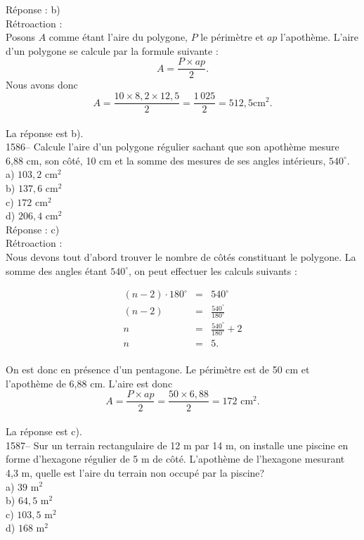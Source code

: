 R\'eponse : b)\\

R\'etroaction :\\
Posons $A$ comme \'etant l'aire du polygone, $P$ le p\'erim\`etre et
$ap$ l'apoth\`eme. L'aire d'un polygone se calcule par la formule
suivante :$$A=\frac{P\times ap}{2}.$$Nous avons
donc$$A=\frac{10\times8,2\times12,5}{2}=\frac{1\,025}{2}=512,5{\textrm{
cm}}^2.$$\\ La r\'eponse est b).\\

1586-- Calcule l'aire d'un polygone r\'egulier sachant que son
apoth\`eme mesure 6,88 cm, son c\^ot\'e, 10 cm et la somme des
mesures de ses angles int\'erieurs, $540^{\circ}.$\\
a) $103,2{\textrm{ cm}}^2$\\
b) $137,6{\textrm{ cm}}^2$\\
c) $172{\textrm{ cm}}^2$\\
d) $206,4{\textrm{ cm}}^2$\\

R\'eponse : c)\\

R\'etroaction :\\
Nous devons tout d'abord trouver le nombre de  c\^ot\'es constituant
le polygone. La somme des angles \'etant $540^{\circ}$, on peut
effectuer les calculs suivants :

\begin{eqnarray*}
(n-2)\cdot180^{\circ}&=&540^{\circ} \\
(n-2)&=&\frac{540^{\circ}}{180 ^{\circ}}\\[3mm]
n&=&\frac{540^{\circ}}{180 ^{\circ}}+ 2\\[3mm]
n&=&5.\\
\end{eqnarray*}

On est donc en pr\'esence d'un pentagone. Le p\'erim\`etre est de 50
cm et l'apoth\`eme de 6,88 cm. L'aire est donc $$A=\frac{P\times
ap}{2}=\frac{50\times6,88}{2}=172
{\textrm{ cm}}^2.$$\\ La r\'eponse est c).\\

1587-- Sur un terrain rectangulaire de 12 m par 14 m, on installe une
piscine en forme d'hexagone r\'egulier de 5 m de c\^ot\'e.
L'apoth\`eme de l'hexagone mesurant 4,3 m, quelle est l'aire du terrain non
occup\'e par la piscine?\\
a) $39{\textrm{ m}}^2$\\
b) $64,5{\textrm{ m}}^2$\\
c) $103,5{\textrm{ m}}^2$\\
d) $168{\textrm{ m}}^2$\\

